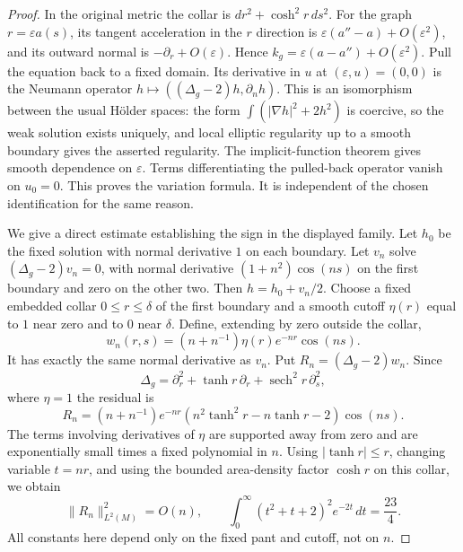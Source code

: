 \begin{proof}
In the original metric the collar is
$dr^2+\cosh^2r\,ds^2$. For the graph $r=\varepsilon a(s)$, its tangent acceleration in the $r$ direction is
$\varepsilon(a''-a)+O(\varepsilon^2)$, and its outward normal is $-\partial_r+O(\varepsilon)$. Hence
$k_g=\varepsilon(a-a'')+O(\varepsilon^2)$.
Pull the equation back to a fixed domain. Its derivative in $u$ at $(\varepsilon,u)=(0,0)$ is the Neumann operator
$h\mapsto((\Delta_g-2)h,\partial_nh)$. This is an isomorphism between the usual H\"older spaces: the form
$\int(|\nabla h|^2+2h^2)$ is coercive, so the weak solution exists uniquely, and local elliptic regularity up to a smooth boundary gives the asserted regularity. The implicit-function theorem gives smooth dependence on $\varepsilon$. Terms differentiating the pulled-back operator vanish on $u_0=0$. This proves the variation formula. It is independent of the chosen identification for the same reason.

We give a direct estimate establishing the sign in the displayed family. Let $h_0$ be the fixed solution with normal derivative $1$ on each boundary. Let $v_n$ solve $(\Delta_g-2)v_n=0$, with normal derivative $(1+n^2)\cos(ns)$ on the first boundary and zero on the other two. Then $h=h_0+v_n/2$.
Choose a fixed embedded collar $0\le r\le\delta$ of the first boundary and a smooth cutoff $\eta(r)$ equal to $1$ near zero and to $0$ near $\delta$. Define, extending by zero outside the collar,
\[
 w_n(r,s)=(n+n^{-1})\eta(r)e^{-nr}\cos(ns).
\]
It has exactly the same normal derivative as $v_n$. Put $R_n=(\Delta_g-2)w_n$. Since
\[
 \Delta_g=\partial_r^2+\tanh r\,\partial_r
                      +\operatorname{sech}^2r\,\partial_s^2,
\]
where $\eta=1$ the residual is
\[
 R_n=(n+n^{-1})e^{-nr}
       (n^2\tanh^2r-n\tanh r-2)\cos(ns).
\]
The terms involving derivatives of $\eta$ are supported away from zero and are exponentially small times a fixed polynomial in $n$. Using $|\tanh r|\le r$, changing variable $t=nr$, and using the bounded area-density factor $\cosh r$ on this collar, we obtain
\[
 \|R_n\|_{L^2(M)}^2=O(n),
 \qquad
 \int_0^\infty(t^2+t+2)^2e^{-2t}\,dt=\frac{23}{4}.
\]
All constants here depend only on the fixed pant and cutoff, not on $n$.


\end{proof}
